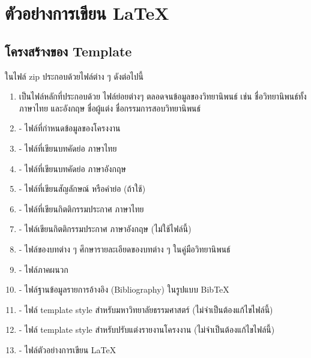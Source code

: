 \chapter{ตัวอย่างการเขียน LaTeX}
\label{example}

\section{โครงสร้างของ Template}
ในไฟล์ zip ประกอบด้วยไฟล์ต่าง ๆ ดังต่อไปนี้
\begin{enumerate}[1.]
    \item {} เป็นไฟล์หลักที่ประกอบด้วย ไฟล์ย่อยต่างๆ ตลอดจนข้อมูลของวิทยานิพนธ์ เช่น ชื่อวิทยานิพนธ์ทั้งภาษาไทย และอังกฤษ ชื่อผู้แต่ง ชื่อกรรมการสอบวิทยานิพนธ์
    \item {} - ไฟล์ที่กำหนดข้อมูลของโครงงาน
    \item {} - ไฟล์ที่เขียนบทคัดย่อ ภาษาไทย
    \item {} - ไฟล์ที่เขียนบทคัดย่อ ภาษาอังกฤษ
    \item {} - ไฟล์ที่เขียนสัญลักษณ์ หรือคำย่อ (ถ้าใช้)
    \item {} - ไฟล์ที่เขียนกิตติกรรมประกาศ ภาษาไทย
    \item {} - ไฟล์เขียนกิตติกรรมประกาศ ภาษาอังกฤษ (ไม่ใช้ไฟล์นี้)
    \item {} - ไฟล์ของบทต่าง ๆ ศึกษารายละเอียดของบทต่าง ๆ ในคู่มือวิทยานิพนธ์~\cite{tu:2556fk}
    \item {} - ไฟล์ภาคผนวก %
    \item {} - ไฟล์ฐานข้อมูลรายการอ้างอิง (Bibliography) ในรูปแบบ BibTeX
    \item {} - ไฟล์ template style สำหรับมหาวิทยาลัยธรรมศาสตร์ (ไม่จำเป็นต้องแก้ไขไฟล์นี้)
    \item {} - ไฟล์ template style สำหรับปรับแต่งรายงานโครงงาน (ไม่จำเป็นต้องแก้ไขไฟล์นี้)
    \item {} - ไฟล์ตัวอย่างการเขียน LaTeX
\end{enumerate}

\newpage
